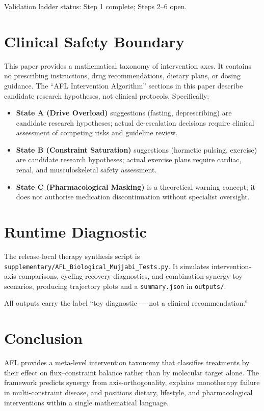 \documentclass[12pt,a4paper]{article}
\begin{document}
Validation ladder status: Step 1 complete; Steps 2--6 open.

\section{Clinical Safety Boundary}

This paper provides a mathematical taxonomy of intervention axes. It contains no prescribing instructions, drug recommendations, dietary plans, or dosing guidance. The ``AFL Intervention Algorithm'' sections in this paper describe candidate research hypotheses, not clinical protocols. Specifically:
\begin{itemize}
  \item \textbf{State A (Drive Overload)} suggestions (fasting, deprescribing) are candidate research hypotheses; actual de-escalation decisions require clinical assessment of competing risks and guideline review.
  \item \textbf{State B (Constraint Saturation)} suggestions (hormetic pulsing, exercise) are candidate research hypotheses; actual exercise plans require cardiac, renal, and musculoskeletal safety assessment.
  \item \textbf{State C (Pharmacological Masking)} is a theoretical warning concept; it does not authorise medication discontinuation without specialist oversight.
\end{itemize}

\section{Runtime Diagnostic}

The release-local therapy synthesis script is \texttt{supplementary/AFL\_Biological\_Mujjabi\_Tests.py}. It simulates intervention-axis comparisons, cycling-recovery diagnostics, and combination-synergy toy scenarios, producing trajectory plots and a \texttt{summary.json} in \texttt{outputs/}.

All outputs carry the label ``toy diagnostic --- not a clinical recommendation.''

\section{Conclusion}

AFL provides a meta-level intervention taxonomy that classifies treatments by their effect on flux--constraint balance rather than by molecular target alone. The framework predicts synergy from axis-orthogonality, explains monotherapy failure in multi-constraint disease, and positions dietary, lifestyle, and pharmacological interventions within a single mathematical language.
\end{document}
